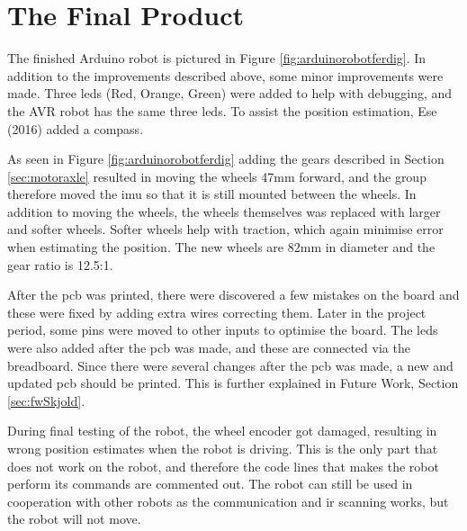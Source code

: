 \newpage
\section{The Final Product}
\label{sec:finardu}
The finished Arduino robot is pictured in Figure \ref{fig:arduinorobotferdig}. In addition to the improvements described above, some minor improvements were made. Three \acrshort{led}s (Red, Orange, Green) were added to help with debugging, and the AVR robot has the same three \acrshort{led}s. To assist the position estimation, Ese (2016) added a compass.

As seen in Figure \ref{fig:arduinorobotferdig} adding the gears described in Section \ref{sec:motoraxle} resulted in moving the wheels 47mm forward, and the group therefore moved the \acrshort{imu} so that it is still mounted between the wheels. In addition to moving the wheels, the wheels themselves was replaced with larger and softer wheels. Softer wheels help with traction, which again minimise error when estimating the position. The new wheels are 82mm in diameter and the gear ratio is 12.5:1.

After the \acrshort{pcb} was printed, there were discovered a few mistakes on the board and these were fixed by adding extra wires correcting them. Later in the project period, some pins were moved to other inputs to optimise the board. The \acrshort{led}s were also added after the \acrshort{pcb} was made, and these are connected via the breadboard. Since there were several changes after the \acrshort{pcb} was made, a new and updated \acrshort{pcb} should be printed. This is further explained in Future Work, Section \ref{sec:fwSkjold}.

During final testing of the robot, the wheel encoder got damaged, resulting in wrong position estimates when the robot is driving. This is the only part that does not work on the robot, and therefore the code lines that makes the robot perform its commands are commented out. The robot can still be used in cooperation with other robots as the communication and \acrshort{ir} scanning works, but the robot will not move.
\vspace*{20pt}
